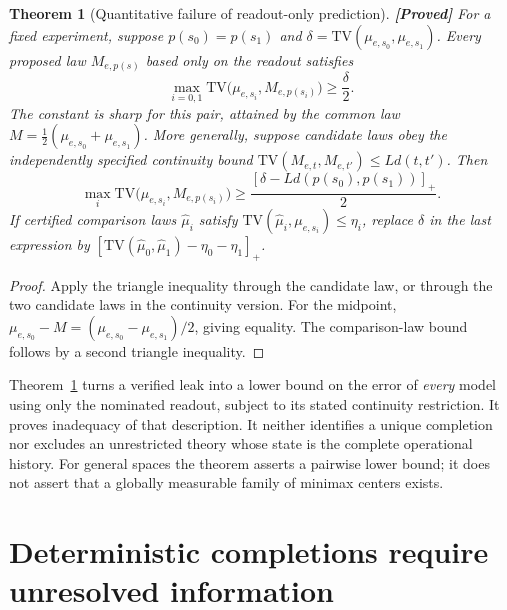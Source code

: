 \documentclass[11pt,a4paper]{article}
\newtheorem{theorem}{Theorem}[section]
\theoremstyle{definition}
\theoremstyle{remark}\newtheorem{remark}[theorem]{Remark}
\newcommand{\status}[1]{\textbf{[#1]}\quad}
\newcommand{\TV}{\mathrm{TV}}
\begin{document}
\begin{theorem}[Quantitative failure of readout-only prediction]
\label{op:radius}
\status{Proved}
For a fixed experiment, suppose $p(s_0)=p(s_1)$ and
$\delta=\TV(\mu_{e,s_0},\mu_{e,s_1})$. Every proposed law
$M_{e,p(s)}$ based only on the readout satisfies
\[
 \max_{i=0,1}\TV\bigl(\mu_{e,s_i},M_{e,p(s_i)}\bigr)
 \ge\frac{\delta}{2}.
\]
The constant is sharp for this pair, attained by the common law
$M=\tfrac12(\mu_{e,s_0}+\mu_{e,s_1})$.
More generally, suppose candidate laws obey the independently specified
continuity bound
$\TV(M_{e,t},M_{e,t'})\le Ld(t,t')$. Then
\[
 \max_i\TV\bigl(\mu_{e,s_i},M_{e,p(s_i)}\bigr)
 \ge\frac{[\delta-Ld(p(s_0),p(s_1))]_+}{2}.
\]
If certified comparison laws $\widehat\mu_i$ satisfy
$\TV(\widehat\mu_i,\mu_{e,s_i})\le\eta_i$, replace $\delta$ in the
last expression by
$[\TV(\widehat\mu_0,\widehat\mu_1)-\eta_0-\eta_1]_+$.
\end{theorem}

\begin{proof}
Apply the triangle inequality through the candidate law, or through the
two candidate laws in the continuity version. For the midpoint,
$\mu_{e,s_0}-M=(\mu_{e,s_0}-\mu_{e,s_1})/2$, giving equality.
The comparison-law bound follows by a second triangle inequality.
\end{proof}

Theorem~\ref{op:radius} turns a verified leak into a lower bound on the
error of \emph{every} model using only the nominated readout, subject to
its stated continuity restriction. It proves inadequacy of that
description. It neither identifies a unique completion nor excludes an
unrestricted theory whose state is the complete operational history.
For general spaces the theorem asserts a pairwise lower bound; it does
not assert that a globally measurable family of minimax centers exists.

\section{Deterministic completions require unresolved information}
\label{op:detsection}
\end{document}
